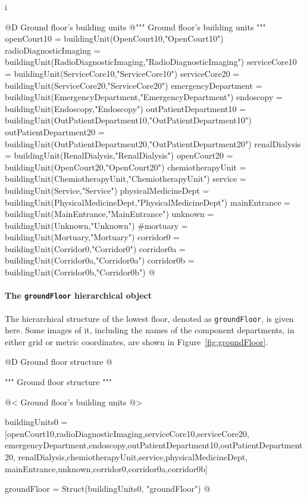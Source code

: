 i\documentclass[11pt,oneside]{article}    %
\begin{document}
@D Ground floor's building units 
@{""" Ground floor's building units """
openCourt10 = buildingUnit(OpenCourt10,"OpenCourt10")
radioDiagnosticImaging = buildingUnit(RadioDiagnosticImaging,"RadioDiagnosticImaging")
serviceCore10 = buildingUnit(ServiceCore10,"ServiceCore10")
serviceCore20 = buildingUnit(ServiceCore20,"ServiceCore20")
emergencyDepartment = buildingUnit(EmergencyDepartment,"EmergencyDepartment")
endoscopy = buildingUnit(Endoscopy,"Endoscopy")
outPatientDepartment10 = buildingUnit(OutPatientDepartment10,"OutPatientDepartment10")
outPatientDepartment20 = buildingUnit(OutPatientDepartment20,"OutPatientDepartment20")
renalDialysis = buildingUnit(RenalDialysis,"RenalDialysis")
openCourt20 = buildingUnit(OpenCourt20,"OpenCourt20")
chemiotherapyUnit = buildingUnit(ChemiotherapyUnit,"ChemiotherapyUnit")
service = buildingUnit(Service,"Service")
physicalMedicineDept = buildingUnit(PhysicalMedicineDept,"PhysicalMedicineDept")
mainEntrance = buildingUnit(MainEntrance,"MainEntrance")
unknown = buildingUnit(Unknown,"Unknown")
#mortuary = buildingUnit(Mortuary,"Mortuary")
corridor0 = buildingUnit(Corridor0,"Corridor0")
corridor0a = buildingUnit(Corridor0a,"Corridor0a")
corridor0b = buildingUnit(Corridor0b,"Corridor0b")
@}

\paragraph{The \texttt{groundFloor} hierarchical object}
The hierarchical structure of the lowest floor, denoted as \texttt{groundFloor}, is given here.
Some images of it, including the names of the component departments, in either grid or metric coordinates, are shown in Figure~\ref{fig:groundFloor}.

@D Ground floor structure
@{""" Ground floor structure """

@< Ground floor's building units @>

buildingUnits0 = [openCourt10,radioDiagnosticImaging,serviceCore10,serviceCore20,
    emergencyDepartment,endoscopy,outPatientDepartment10,outPatientDepartment20,
    renalDialysis,chemiotherapyUnit,service,physicalMedicineDept,
    mainEntrance,unknown,corridor0,corridor0a,corridor0b]
    
groundFloor = Struct(buildingUnits0, "groundFloor")
@}
\end{document}

